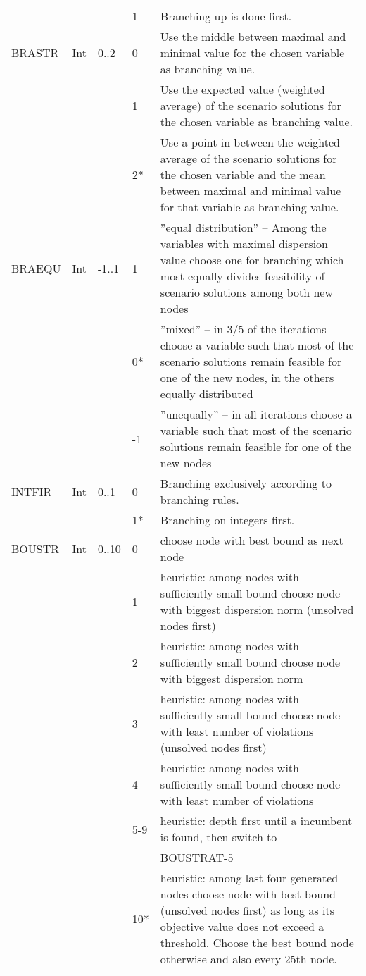 \documentclass[11pt,draft]{article}
\newcommand{\+}{{\ti{+}}}
\newcommand{\1}{{\ti{1}}}
\begin{document}
\begin{center}
\begin{supertabular}{|llllp{6.2cm}|}
&&&1&Branching up is done first. \\[0.2em]
BRASTR&Int&0..2&0&Use the middle between maximal and minimal value for the chosen variable as branching value.\\
&&&1&Use the expected value (weighted average) of the scenario solutions for the chosen variable as branching value.\\
&&&2*&Use a point in between the weighted average of the scenario solutions for the chosen variable and the mean between maximal and minimal value for that variable as branching value.\\[0.2em]
BRAEQU&Int&-1..1&1&''equal distribution'' -- Among the variables with maximal dispersion value choose one for branching which most equally divides feasibility of scenario solutions among both new nodes\\
&&&0*&''mixed'' -- in 3/5 of the iterations choose a variable such that most of the scenario solutions remain feasible for one of the new nodes, in the others equally distributed\\[0.2em]
&&&-1&''unequally'' -- in all iterations choose a variable such that most of the scenario solutions remain feasible for one of the new nodes \\[0.2em]
INTFIR&Int&0..1&0&Branching exclusively according to branching rules.\\[0.2em]
&&&1*&Branching on integers first.\\
BOUSTR&Int&0..10&0&choose node with best bound as next node\\
&&&1& heuristic: among nodes with sufficiently small bound choose node with biggest dispersion norm (unsolved nodes first)\\
&&&2& heuristic: among nodes with sufficiently small bound choose node with biggest dispersion norm\\
&&&3& heuristic: among nodes with sufficiently small bound choose node with least number of violations (unsolved nodes first)\\
&&&4& heuristic: among nodes with sufficiently small bound choose node with least number of violations\\
&&&5-9& heuristic: depth first until a incumbent is found, then switch to\\&&&& BOUSTRAT-5\\[0.2em]
&&&10*& heuristic: among last four generated nodes choose node with best bound (unsolved nodes first) as long as its objective value does not exceed a threshold. Choose the best bound node otherwise and also every 25th node.\\

\end{supertabular}
\end{center}
\end{document}

